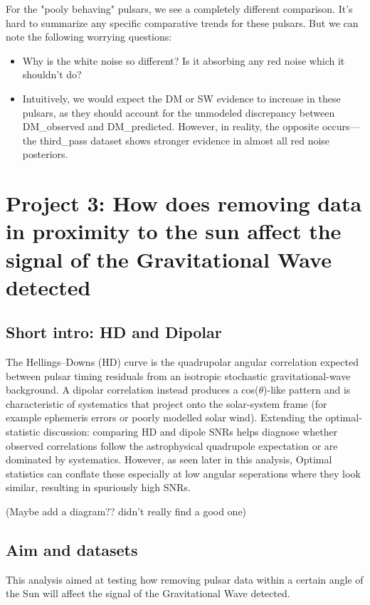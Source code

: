 \documentclass[12pt,a4paper]{article}
\begin{document}
For the "pooly behaving" pulsars, we see a completely different comparison. It's hard to summarize any specific comparative trends for these pulsars. But we can note the following worrying questions:

\begin{itemize}
  \item Why is the white noise so different? Is it absorbing any red noise which it shouldn't do?
  \item Intuitively, we would expect the DM or SW evidence to increase in these pulsars, as they should account for the unmodeled discrepancy between DM\_observed and DM\_predicted. However, in reality, the opposite occurs---the third\_pass dataset shows stronger evidence in almost all red noise posteriors.
\end{itemize}

\newpage

\section{Project 3: How does removing data in proximity to the sun affect the signal of the Gravitational Wave detected}


\subsection{Short intro: HD and Dipolar}
The Hellings--Downs (HD) curve is the quadrupolar angular correlation expected between pulsar timing residuals from an isotropic stochastic gravitational-wave background. A dipolar correlation instead produces a cos(\(\theta\))-like pattern and is characteristic of systematics that project onto the solar-system frame (for example ephemeris errors or poorly modelled solar wind). Extending the optimal-statistic discussion: comparing HD and dipole SNRs helps diagnose whether observed correlations follow the astrophysical quadrupole expectation or are dominated by systematics. However, as seen later in this analysis, Optimal statistics can conflate these especially at low angular seperations where they look similar, resulting in spuriously high SNRs.

(Maybe add a diagram?? didn't really find a good one)

\subsection{Aim and datasets}
This analysis aimed at testing how removing pulsar data within a certain angle of the Sun will affect the signal of the Gravitational Wave detected.
\end{document}
